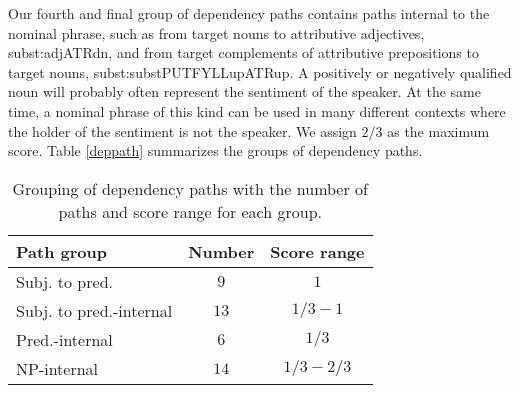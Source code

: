 \documentclass[11pt]{article}
\begin{document}
Our fourth and final group of dependency paths contains paths internal to the nominal phrase, such as from target nouns to attributive adjectives, subst:adj{\textunderscore}{\textunderscore}ATR{\textunderscore}dn, and from target complements of attributive prepositions to target nouns, subst:subst{\textunderscore}{\textunderscore}PUTFYLL{\textunderscore}up{\textunderscore}{\textunderscore}ATR{\textunderscore}up. A positively or negatively qualified noun will probably often represent the sentiment of the speaker. At the same time, a nominal phrase of this kind can be used in many different contexts where the holder of the sentiment is not the speaker. We assign $2/3$ as the maximum score. Table \ref{deppath} summarizes the groups of dependency paths.
\begin{table}[h]
\begin{center}
\begin{tabular}{|l|cc|}
\hline \bf Path group & \bf Number & \bf Score range \\ \hline
Subj. to pred. & $9$ & $1$ \\
Subj. to pred.-internal & $13$ & $1/3-1$ \\
Pred.-internal & $6$ & $1/3$ \\
NP-internal & $14$ & $1/3-2/3$ \\
\hline
\end{tabular}
\end{center}
\caption{\label{deppath} Grouping of dependency paths with the number of paths and score range for each group.}
\label{tab:paths}
\end{table}
\end{document}
